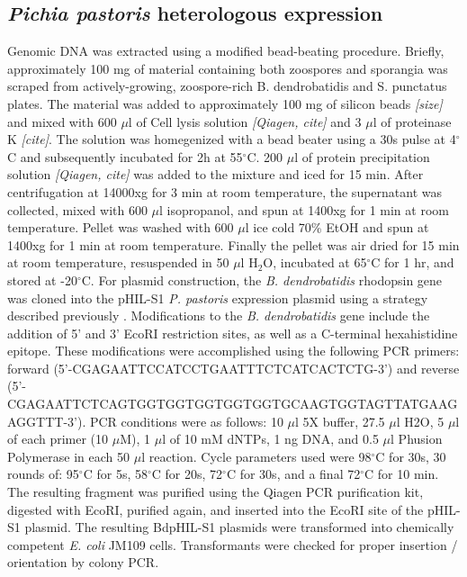 \subsection{\textit{Pichia pastoris} heterologous expression}
Genomic DNA was extracted using a modified bead-beating procedure. Briefly, approximately 100 mg of material containing both zoospores and sporangia was scraped from actively-growing, zoospore-rich B. dendrobatidis and S. punctatus plates. The material was added to approximately 100 mg of silicon beads \emph{[size]} and mixed with 600 $\mu$l of Cell lysis solution \emph{[Qiagen, cite]} and 3 $\mu$l of proteinase K \emph{[cite]}. The solution was homegenized with a bead beater using a 30s pulse at 4$^{\circ}$C and subsequently incubated for 2h at 55$^{\circ}$C. 200 $\mu$l of protein precipitation solution \emph{[Qiagen, cite]} was added to the mixture and iced for 15 min. After centrifugation at 14000xg for 3 min at room temperature, the supernatant was collected, mixed with 600 $\mu$l isopropanol, and spun at 1400xg for 1 min at room temperature. Pellet was washed with 600 $\mu$l ice cold 70\% EtOH and spun at 1400xg for 1 min at room temperature. Finally the pellet was air dried for 15 min at room temperature, resuspended in 50 $\mu$l H$_{2}$O, incubated at 65$^{\circ}$C for 1 hr, and stored at -20$^{\circ}$C.
\indent For plasmid construction, the \textit{B. dendrobatidis} rhodopsin gene was cloned into the pHIL-S1 \textit{P. pastoris} expression plasmid using a strategy described previously \cite{Bieszke1999}.  Modifications to the \textit{B. dendrobatidis} gene include the addition of 5' and 3' EcoRI restriction sites, as well as a C-terminal hexahistidine epitope. These modifications were accomplished using the following PCR primers: forward (5'-CGAGAATTCCATCCTGAATTTCTCATCACTCTG-3') and reverse (5'-CGAGAATTCTCAGTGGTGGTGGTGGTGGTGCAAGTGGTAGTTATGAAGAGGTTT-3'). PCR conditions were as follows: 10 $\mu$l 5X buffer, 27.5 $\mu$l H2O, 5 $\mu$l of each primer (10 $\mu$M), 1 $\mu$l of 10 mM dNTPs, 1 ng DNA, and 0.5 $\mu$l Phusion Polymerase in each 50 $\mu$l reaction. Cycle parameters used were 98$^{\circ}$C for 30s, 30 rounds of: 95$^{\circ}$C for 5s, 58$^{\circ}$C for 20s, 72$^{\circ}$C for 30s, and a final 72$^{\circ}$C for 10 min. The resulting fragment was purified using the Qiagen PCR purification kit, digested with EcoRI, purified again, and inserted into the EcoRI site of the pHIL-S1 plasmid. The resulting BdpHIL-S1 plasmids were transformed into chemically competent \textit{E. coli} JM109 cells. Transformants were checked for proper insertion / orientation by colony PCR.\\ 
